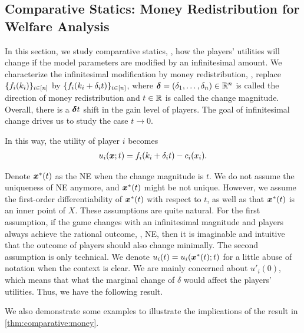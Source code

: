 \subsection{Comparative Statics: Money Redistribution for Welfare Analysis}
\label{subsec:comparative_money}


In this section, we study comparative statics, \ie, how the players' utilities will change if the model parameters are modified by an infinitesimal amount. 
We characterize the infinitesimal modification by money redistribution, \ie, replace $\{f_i(k_i)\}_{i\in[n]}$ by $\{f_i(k_i + \delta_i t)\}_{i\in[n]}$, where $\bm{\delta} = (\delta_1,\dots, \delta_n)\in\mathbb{R}^n$ is called the direction of money redistribution and $t\in \mathbb{R}$ is called the change magnitude. 
Overall, there is a $\bm{\delta} t$ shift in the gain level of players.
The goal of infinitesimal change drives us to study the case $t\to 0$.

In this way, the utility of player $i$ becomes
\begin{eqnarray*}
  u_i({\bm{x}};t) = f_i(k_i + \delta_i t) - c_i(x_i).   
\end{eqnarray*}

Denote ${\bm{x}}^*(t)$ as the NE when the change magnitude is $t$. We do not assume the uniqueness of NE anymore, and ${\bm{x}}^*(t)$ might be not unique. However, we assume the first-order differentiability of ${\bm{x}}^*(t)$ with respect to $t$, as well as that ${\bm{x}}^*(t)$ is an inner point of $X$. 
These assumptions are quite natural. 
For the first assumption, if the game changes with an infinitesimal magnitude and players always achieve the rational outcome, \ie, NE, then it is imaginable and intuitive that the outcome of players should also change minimally.
The second assumption is only technical.
We denote $u_i(t) = u_i({\bm{x}}^*(t);t)$ for a little abuse of notation when the context is clear. We are mainly concerned about $u'_i(0)$, which means that what the marginal change of $\delta$ would affect the players' utilities. Thus, we have the following result.




We also demonstrate some examples to illustrate the implications of the result in \cref{thm:comparative:money}.


